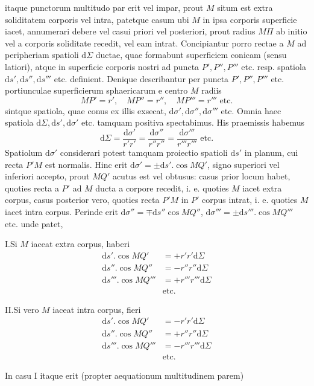 itaque punctorum multitudo par erit vel impar, prout $M$ situm est extra soliditatem corporis vel intra, patetque casum ubi $M$ in ipsa corporis superficie iacet, annumerari debere vel casui priori vel posteriori, prout radius $M\Pi$ ab initio vel a corporis soliditate recedit, vel eam intrat. Concipiantur porro rectae a $M$ ad peripheriam spatioli $\mathrm{d}\Sigma$ ductae, quae formabunt superficiem conicam (sensu latiori), atque in superficie corporis nostri ad puncta $P',P'',P'''$ etc. resp. spatiola $\mathrm{d}s',\mathrm{d}s'',\mathrm{d}s'''$ etc. definient. Denique describantur per puncta $P',P'',P'''$ etc. portiunculae superficierum sphaericarum e centro $M$ radiis
\[
MP'=r',\quad MP''=r'',\quad MP'''=r'''\text{ etc.}
\]
sintque spatiola, quae conus ex illis exsecat, $\mathrm{d}\sigma',\mathrm{d}\sigma'',\mathrm{d}\sigma'''$ etc. Omnia haec spatiola $\mathrm{d}\Sigma,\mathrm{d}s',\mathrm{d}\sigma'$ etc. tamquam positiva spectabimus. His praemissis habemus
\[
\mathrm{d}\Sigma=\frac{\mathrm{d}\sigma'}{r'r'}=\frac{\mathrm{d}\sigma''}{r''r''}=\frac{\mathrm{d}\sigma'''}{r'''r'''}\text{ etc.}
\]
Spatiolum $\mathrm{d}\sigma'$ considerari potest tamquam proiectio spatioli $\mathrm{d}s'$ in planum, cui recta $P'M$ est normalis. Hinc erit $\mathrm{d}\sigma'=\pm\mathrm{d}s'.\cos MQ'$, signo superiori vel inferiori accepto, prout $MQ'$ acutus est vel obtusus: casus prior locum habet, quoties recta a $P'$ ad $M$ ducta a corpore recedit, i. e. quoties $M$ iacet extra corpus, casus posterior vero, quoties recta $P'M$ in $P'$ corpus intrat, i. e. quoties $M$ iacet intra corpus. Perinde erit $\mathrm{d}\sigma''=\mp\mathrm{d}s''\cos MQ''$, $\mathrm{d}\sigma'''=\pm\mathrm{d}s'''.\cos MQ'''$ etc. unde patet,
\par
I.\quad Si $M$ iaceat extra corpus, haberi
\[
\begin{aligned}
\mathrm{d}s'.\cos MQ'&=+r'r'\mathrm{d}\Sigma\\
\mathrm{d}s''.\cos MQ''&=-r''r''\mathrm{d}\Sigma\\
\mathrm{d}s'''.\cos MQ'''&=+r'''r'''\mathrm{d}\Sigma\\
&\text{etc.}
\end{aligned}
\]
\par
II.\quad Si vero $M$ iaceat intra corpus, fieri
\[
\begin{aligned}
\mathrm{d}s'.\cos MQ'&=-r'r'\mathrm{d}\Sigma\\
\mathrm{d}s''.\cos MQ''&=+r''r''\mathrm{d}\Sigma\\
\mathrm{d}s'''.\cos MQ'''&=-r'''r'''\mathrm{d}\Sigma\\
&\text{etc.}
\end{aligned}
\]
\par
In casu I itaque erit (propter aequationum multitudinem parem)

